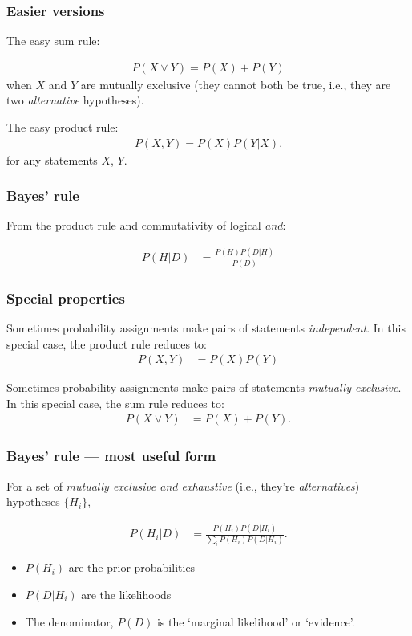 \documentclass{beamer}
\begin{document}
\begin{frame}
\frametitle{Easier versions}
The easy sum rule:

\begin{align}
P(X \vee Y) = P(X) + P(Y)
\end{align}
when $X$ and $Y$ are mutually exclusive (they cannot both be true, i.e.,
they are two {\em alternative} hypotheses).

The easy product rule:
\begin{align}
P(X, Y) = P(X)P(Y | X).
\end{align}
for any statements $X$, $Y$.

\end{frame}


\begin{frame}
\frametitle{Bayes' rule}

From the product rule and commutativity of logical {\em and}:

\begin{align}
P(H|D) &= \frac{P(H)P(D|H)}{P(D)}
\end{align}

\end{frame}


\begin{frame}
\frametitle{Special properties}
Sometimes probability assignments make pairs of statements
{\em independent}. In this special case, the product rule reduces to:
\begin{align}
P(X,Y) &= P(X)P(Y)
\end{align}

Sometimes probability assignments make pairs of statements
{\em mutually exclusive}. In this special case, the sum rule reduces to:
\begin{align}
P(X \vee Y) &= P(X) + P(Y).
\end{align}

\end{frame}

\begin{frame}
\frametitle{Bayes' rule --- most useful form}
For a set of {\em mutually exclusive and exhaustive} (i.e., they're
{\em alternatives}) hypotheses $\{H_i\}$,

\begin{align}
P(H_i|D) &= \frac{P(H_i)P(D|H_i)}{\sum_i P(H_i)P(D|H_i)}.
\end{align}

\begin{itemize}
\item $P(H_i)$ are the prior probabilities
\item $P(D|H_i)$ are the likelihoods
\item The denominator, $P(D)$ is the `marginal likelihood' or `evidence'.
\end{itemize}

\end{frame}
\end{document}
